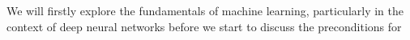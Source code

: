 We will firstly explore the fundamentals of machine learning, particularly in the context of deep neural networks before we start to discuss the preconditions for 